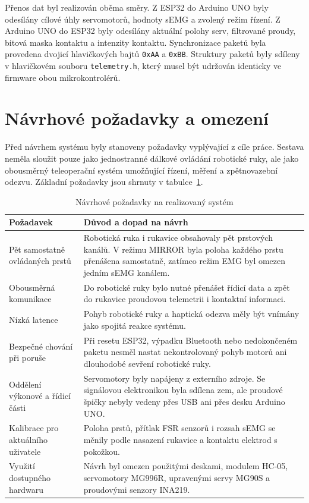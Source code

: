 Přenos dat byl realizován oběma směry. Z ESP32 do Arduino UNO byly odesílány cílové úhly servomotorů, hodnoty sEMG a zvolený režim řízení. Z Arduino UNO do ESP32 byly odesílány aktuální polohy serv, filtrované proudy, bitová maska kontaktu a intenzity kontaktu. Synchronizace paketů byla provedena dvojicí hlavičkových bajtů \texttt{0xAA} a \texttt{0xBB}. Struktury paketů byly sdíleny v hlavičkovém souboru \texttt{telemetry.h}, který musel být udržován identicky ve firmware obou mikrokontrolérů.

\section{Návrhové požadavky a omezení}
\label{sec:pozadavky-omezeni}

Před návrhem systému byly stanoveny požadavky vyplývající z cíle práce. Sestava neměla sloužit pouze jako jednostranné dálkové ovládání robotické ruky, ale jako obousměrný teleoperační systém umožňující řízení, měření a zpětnovazební odezvu. Základní požadavky jsou shrnuty v tabulce~\ref{tab:pozadavky-system}.

\begin{table}[htbp]
\centering
\caption{Návrhové požadavky na realizovaný systém}
\label{tab:pozadavky-system}
\begin{tabular}{|p{}|p{}|}
\hline
\textbf{Požadavek} & \textbf{Důvod a dopad na návrh} \\
\hline
Pět samostatně ovládaných prstů & Robotická ruka i rukavice obsahovaly pět prstových kanálů. V režimu MIRROR byla poloha každého prstu přenášena samostatně, zatímco režim EMG byl omezen jedním sEMG kanálem. \\
\hline
Obousměrná komunikace & Do robotické ruky bylo nutné přenášet řídicí data a zpět do rukavice proudovou telemetrii i kontaktní informaci. \\
\hline
Nízká latence & Pohyb robotické ruky a haptická odezva měly být vnímány jako spojitá reakce systému. \\
\hline
Bezpečné chování při poruše & Při resetu ESP32, výpadku Bluetooth nebo nedokončeném paketu nesměl nastat nekontrolovaný pohyb motorů ani dlouhodobé sevření robotické ruky. \\
\hline
Oddělení výkonové a řídicí části & Servomotory byly napájeny z externího zdroje. Se signálovou elektronikou byla sdílena zem, ale proudové špičky nebyly vedeny přes USB ani přes desku Arduino UNO\@. \\
\hline
Kalibrace pro aktuálního uživatele & Poloha prstů, přítlak FSR senzorů i rozsah sEMG se měnily podle nasazení rukavice a kontaktu elektrod s pokožkou. \\
\hline
Využití dostupného hardwaru & Návrh byl omezen použitými deskami, modulem HC-05, servomotory MG996R, upravenými servy MG90S a proudovými senzory INA219. \\
\hline
\end{tabular}
\end{table}

